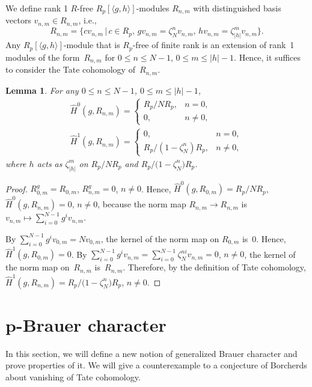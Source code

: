 \documentclass[pdftex]{sigma}%
\numberwithin{equation}{section}
\newtheorem{Lemma}[Theorem]{Lemma}
\begin{document}
We define rank 1 $R$-free $R_p[\langle g,h \rangle]$-modules $R_{n,m}$ with distinguished basis vectors $v_{n,m}\in R_{n,m}$, i.e.,
\[
R_{n,m}=\big\{cv_{n,m}\,|\,c\in R_p,\, gv_{n,m}=\zeta_N^nv_{n,m},\, hv_{n,m}=\zeta_{|h|}^mv_{n,m}\big\}.
\]
 Any $R_p[\langle g,h \rangle]$-module that is $R_p$-free of finite rank is an extension of rank~1 modules of the form~$R_{n,m}$ for $0\leq n\leq N-1$, $0\leq m\leq |h|-1$.
Hence, it suffices to consider the Tate cohomology of~$R_{n,m}$.

\begin{Lemma}\label{Tcoho}
For any $0\leq n \leq N-1$, $0\leq m \leq |h|-1$,
\begin{gather*}
\hat{H}^0(g,R_{n,m})= \begin{cases}
R_p/NR_p, & n=0, \\
0, & n\neq 0,
\end{cases}\\
\hat{H}^1(g,R_{n,m})= \begin{cases}
0, & n=0, \\
R_p/(1-\zeta_N^n)R_p, & n\neq 0,
\end{cases}
\end{gather*}
where $h$ acts as $\zeta_{|h|}^m$ on $R_p/NR_p$ and $R_p/\big(1-\zeta_N^n\big)R_p$.
\end{Lemma}

\begin{proof}
$R_{0,m}^g=R_{0,m}$, $R_{n,m}^g=0$, $n\neq 0$. Hence, $\hat{H}^0(g,R_{0,m})=R_p/NR_p$,
 $\hat{H}^0(g,R_{n,m})=0$, $n\neq 0$, because the norm map $R_{n,m} \rightarrow R_{n,m}$ is $v_{n,m} \mapsto \sum_{i=0}^{N-1}g^iv_{n,m}$.

By $\sum_{i=0}^{N-1}g^iv_{0,m}=Nv_{0,m}$, the kernel of the norm map on $R_{0,m}$ is~0. Hence, $\hat{H}^1(g,R_{0,m})=0$. By $\sum_{i=0}^{N-1}g^iv_{n,m}=\sum_{i=0}^{N-1}\zeta_N^{ni}v_{n,m}=0$, $n \neq 0$, the kernel of the norm map on~$R_{n,m}$ is~$R_{n,m}$. Therefore, by the definition of Tate cohomology, $\hat{H}^1(g,R_{n,m})=R_p/\big(1-\zeta_N^n\big)R_p$, $n\neq 0$.
\end{proof}

\section[p-Brauer character]{$\boldsymbol{p}$-Brauer character}\label{section5}

In this section, we will define a new notion of generalized Brauer character and prove properties of it. We will give a counterexample to a conjecture of Borcherds about vanishing of Tate cohomology.
\end{document}
